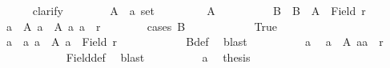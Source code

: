 \begin{isabellebody}
\ \ \ \ \isamarkupfalse%
\ clarify\isanewline
\ \ \ \ \ \ \isamarkupfalse%
\ A\ {\isacharcolon}{\kern0pt}{\isacharcolon}{\kern0pt}\ {\isachardoublequoteopen}{\isacharprime}{\kern0pt}a\ set{\isachardoublequoteclose}\isanewline
\ \ \ \ \ \ \isamarkupfalse%
\ {\isacharasterisk}{\kern0pt}{\isacharasterisk}{\kern0pt}{\isacharcolon}{\kern0pt}\ {\isachardoublequoteopen}A\ {\isasymnoteq}\ {\isacharbraceleft}{\kern0pt}{\isacharbraceright}{\kern0pt}{\isachardoublequoteclose}\isanewline
\ \ \ \ \ \ \isamarkupfalse%
\ B\ \ {\isachardoublequoteopen}B\ {\isacharequal}{\kern0pt}\ A\ {\isasyminter}\ Field\ r{\isachardoublequoteclose}\isanewline
\ \ \ \ \ \ \isamarkupfalse%
\ {\isachardoublequoteopen}{\isasymexists}a\ {\isasymin}\ A{\isachardot}{\kern0pt}\ {\isasymforall}a{\isacharprime}{\kern0pt}\ {\isasymin}\ A{\isachardot}{\kern0pt}\ {\isacharparenleft}{\kern0pt}a{\isacharprime}{\kern0pt}{\isacharcomma}{\kern0pt}\ a{\isacharparenright}{\kern0pt}\ {\isasymnotin}\ r{\isachardoublequoteclose}\isanewline
\ \ \ \ \ \ \isamarkupfalse%
\ {\isacharparenleft}{\kern0pt}cases\ {\isachardoublequoteopen}B\ {\isacharequal}{\kern0pt}\ {\isacharbraceleft}{\kern0pt}{\isacharbraceright}{\kern0pt}{\isachardoublequoteclose}{\isacharparenright}{\kern0pt}\isanewline
\ \ \ \ \ \ \ \ \isamarkupfalse%
\ True\isanewline
\ \ \ \ \ \ \ \ \isamarkupfalse%
\ {\isacharasterisk}{\kern0pt}{\isacharasterisk}{\kern0pt}\ \isamarkupfalse%
\ a\ \ a{\isacharcolon}{\kern0pt}\ {\isachardoublequoteopen}a\ {\isasymin}\ A{\isachardoublequoteclose}\ {\isachardoublequoteopen}a\ {\isasymnotin}\ Field\ r{\isachardoublequoteclose}\isanewline
\ \ \ \ \ \ \ \ \ \ \isamarkupfalse%
\ B{\isacharunderscore}{\kern0pt}def\ \isamarkupfalse%
\ blast\isanewline
\ \ \ \ \ \ \ \ \isamarkupfalse%
\ a\ \isamarkupfalse%
\ {\isachardoublequoteopen}{\isasymforall}a{\isacharprime}{\kern0pt}\ {\isasymin}\ A{\isachardot}{\kern0pt}\ {\isacharparenleft}{\kern0pt}a{\isacharprime}{\kern0pt}{\isacharcomma}{\kern0pt}a{\isacharparenright}{\kern0pt}\ {\isasymnotin}\ r{\isachardoublequoteclose}\isanewline
\ \ \ \ \ \ \ \ \ \ \isamarkupfalse%
\ Field{\isacharunderscore}{\kern0pt}def\ \isamarkupfalse%
\ blast\isanewline
\ \ \ \ \ \ \ \ \isamarkupfalse%
\ a\ \isamarkupfalse%
\ {\isacharquery}{\kern0pt}thesis\ \isamarkupfalse%

\end{isabellebody}
